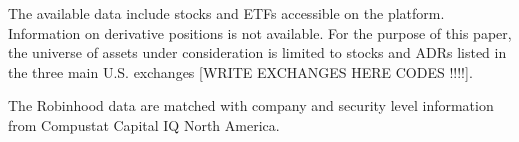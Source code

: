 \documentclass[12pt]{article}
\numberwithin{equation}{section} %
\begin{document}
The available data include stocks and ETFs accessible on the platform. Information on derivative positions is not available. For the purpose of this paper, the universe of assets under consideration is limited to stocks and ADRs listed in the three main U.S. exchanges [WRITE EXCHANGES HERE CODES !!!!].

The Robinhood data are matched with company and security level information from Compustat Capital IQ North America.








% 
%
 
 
 
 
\end{document}
